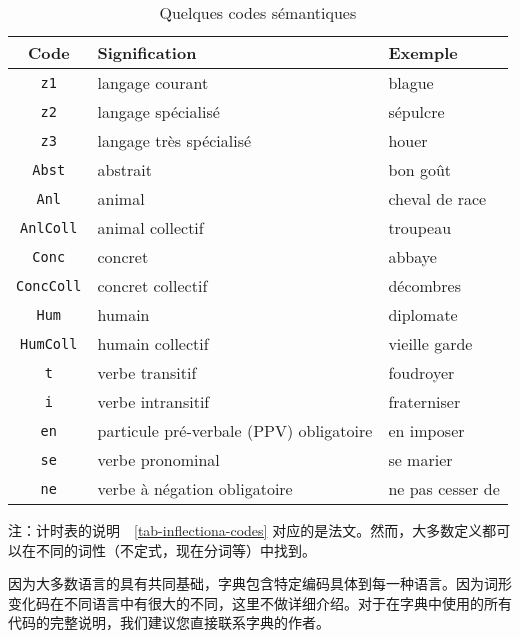 \begin{table}[!h]
\begin{center}
\begin{tabular}{|c|l|l|}
\hline
\textbf{Code} & \textbf{Signification} & \textbf{Exemple} \\
\hline
\verb+z1+ & langage courant & blague \\
\hline
\verb+z2+ & langage spécialisé & sépulcre \\
\hline
\verb+z3+ & langage très spécialisé & houer \\
\hline
\verb+Abst+ & abstrait & bon goût \\
\hline
\verb+Anl+ & animal & cheval de race \\
\hline
\verb+AnlColl+ & animal collectif & troupeau \\
\hline
\verb+Conc+ & concret & abbaye \\
\hline
\verb+ConcColl+ & concret collectif & décombres \\
\hline
\verb+Hum+ & humain & diplomate \\
\hline
\verb+HumColl+ & humain collectif & vieille garde \\
\hline
\verb+t+ & verbe transitif & foudroyer \\
\hline
\verb+i+ & verbe intransitif & fraterniser \\
\hline
\verb+en+ & particule pré-verbale (PPV) obligatoire & en imposer \\
\hline
\verb+se+ & verbe pronominal & se marier \\
\hline
\verb+ne+ & verbe à négation obligatoire & ne pas cesser de \\
\hline
\end{tabular}
\caption{Quelques codes sémantiques\label{tab-semantic-codes}}
\end{center}
\end{table}

\noindent 注：计时表的说明\ ~\ref{tab-inflectiona-codes} 对应的是法文。然而，大多数定义都可以在不同的词性（不定式，现在分词等）中找到。


\bigskip
\noindent 因为大多数语言的具有共同基础，字典包含特定编码具体到每一种语言。因为词形变化码在不同语言中有很大的不同，这里不做详细介绍。对于在字典中使用的所有代码的完整说明，我们建议您直接联系字典的作者。


